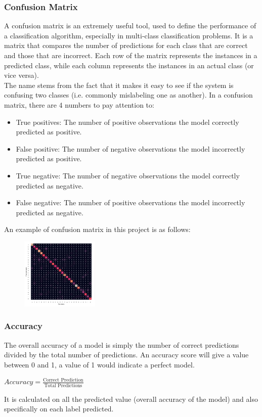 \documentclass{article}
\begin{document}
\subsubsection*{Confusion Matrix}
A confusion matrix is an extremely useful tool, used to define the performance of a classification algorithm, especially in multi-class classification problems. It is a matrix that compares the number of predictions for each class that are correct and those that are incorrect. Each row of the matrix represents the instances in a predicted class, while each column represents the instances in an actual class (or vice versa).\\ The name stems from the fact that it makes it easy to see if the system is confusing two classes (i.e. commonly mislabeling one as another).  
In a confusion matrix, there are 4 numbers to pay attention to:
\begin{itemize}
    \item True positives: The number of positive observations the model correctly predicted as positive.
    \item False positive: The number of negative observations the model incorrectly predicted as positive.
    \item True negative: The number of negative observations the model correctly predicted as negative.
    \item False negative: The number of positive observations the model incorrectly predicted as negative.
\end{itemize}
An example of confusion matrix in this project is as follows:
\begin{figure}[H]
        \begin{center}
        \includegraphics[width=0.33\textwidth]{cm.png}
        \end{center}
\end{figure} 

\subsubsection*{Accuracy}
The overall accuracy of a model is simply the number of correct predictions divided by the total number of predictions. An accuracy score will give a value between 0 and 1, a value of 1 would indicate a perfect model.
\begin{center}
    \begin{math}
Accuracy = \frac{\mbox{Correct Prediction}}{\mbox{Total Predictions}}
\end{math}
\end{center}
It is calculated on all the predicted value (overall accuracy of the model) and also specifically on each label predicted. 
\end{document}
